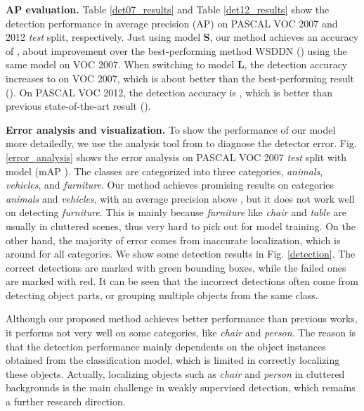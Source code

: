 \documentclass[10pt,twocolumn,letterpaper]{article}
\begin{document}
\noindent  \textbf{AP evaluation.} Table \ref{det07_results} and Table \ref{det12_results} show the detection performance in average precision (AP) on PASCAL VOC 2007 and 2012 \emph{test} split, respectively. Just using model \textbf{S}, our method achieves an accuracy of , \ie about  improvement over the best-performing method WSDDN \cite{Bilen_2016_CVPR} () using the same model on VOC 2007. When switching to model \textbf{L}, the detection accuracy increases to  on VOC 2007, which is about  better than the best-performing result \cite{jie2017deep} (). On PASCAL VOC 2012, the detection accuracy is , which is   better than previous state-of-the-art result \cite{jie2017deep} ().

\noindent  \textbf{Error analysis and visualization.}  To show the performance of our model more detailedly, we use the analysis tool from \cite{hoiem2012diagnosing} to diagnose the detector error. Fig. \ref{error_analysis} shows the error analysis on PASCAL VOC 2007 \emph{test} split with model  (mAP ). The classes are categorized into three categories, \emph{animals}, \emph{vehicles}, and \emph{furniture}. Our method achieves promising results on categories \emph{animals} and \emph{vehicles}, with an average precision above , but it does not work well on detecting \emph{furniture}. This is mainly because \emph{furniture} like \emph{chair} and \emph{table} are usually in cluttered scenes, thus very hard to pick out for model training. On the other hand, the majority of error comes from inaccurate localization, which is around  for all categories. We show some detection results in Fig. \ref{detection}. The correct detections are marked with green bounding boxes, while the failed ones are marked with red. It can be seen that the incorrect detections often come from detecting object parts, or grouping multiple objects from the same class.

Although our proposed method achieves better performance than previous works, it performs not very well on some categories, like \emph{chair} and \emph{person}. The reason is that the detection performance mainly dependents on the object instances obtained from the classification model, which is limited in correctly localizing these objects. Actually, localizing objects such as \emph{chair} and \emph{person} in cluttered backgrounds is the main challenge in weakly supervised detection, which remains  a further research direction.
\end{document}
